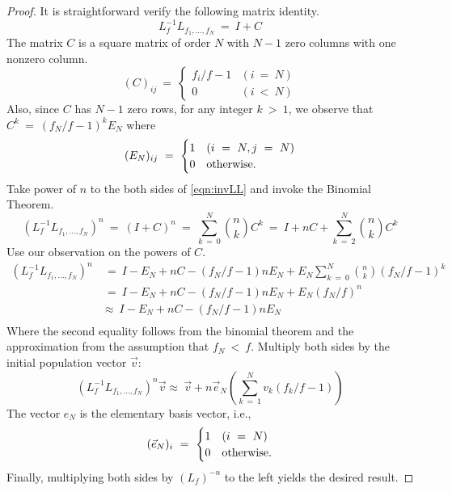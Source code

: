 \documentclass[11pt,reqno]{amsart}
\numberwithin{equation}{section}
\theoremstyle{plain}
\begin{document}
\begin{proof}
It is straightforward verify the following matrix identity. 
\begin{equation}\label{eqn:invLL}
L_f^{-1}L_{f_1, \dots, f_N} \ = \ I + C
\end{equation}
The matrix $C$ is a square matrix of order $N$ with $N-1$ zero columns with 
one nonzero column. 
\begin{equation}
(C)_{ij} \ = \ \begin{cases}
f_i/f - 1 &(i \ = \  N)\\
0 & (i \ < \  N)
\end{cases}
\end{equation}
Also, since $C$ has $N-1$ zero rows, for any integer $k \ > \  1$, we observe that $C^k \ = \ (f_N/f - 1)^k E_N$ where 
\begin{equation}
(E_N)_{ij} \ = \ \begin{cases} 1 & (i \ = \  N, j \ = \  N) \\ 
0 & \rm otherwise.
\end{cases}
\end{equation}
Take power of $n$ to the both sides of \eqref{eqn:invLL} and invoke the Binomial Theorem. 
\begin{equation}
(L_f^{-1}L_{f_1, \dots, f_N} )^n \ = \ 
(I + C)^n \ = \  \sum_{k \ = \  0}^N \binom{n}{k} C^k 
\ = \ I + nC + \sum_{k \ = \  2}^N \binom{n}{k} C^k 
\end{equation}
Use our observation on the powers of $C$. 
\begin{equation}
\begin{split}
(L_f^{-1}L_{f_1, \dots, f_N} )^n & \ = 
\ I - E_N + nC - (f_N/f - 1) n E_N 
+ E_N \sum_{k \ = \  0}^N \binom{n}{k} (f_N/f - 1)^k \\ 
& \ = \ I - E_N + nC - (f_N/f - 1) n E_N 
+ E_N (f_N/f)^n\\ 
& \approx \ I - E_N + nC - (f_N/f - 1) n E_N \\ 
\end{split}
\end{equation}
Where the second equality follows from the binomial theorem and the approximation from the assumption that $f_N \ < \  f$. Multiply both sides by the initial population vector $\vec v$: 
\begin{equation}
(L_f^{-1}L_{f_1, \dots, f_N} )^n\vec v \approx \ 
\vec v + n \vec e_N \left(\sum_{k \ = \  1}^N v_k(f_k/f -1)\right) 
\end{equation}
The vector $e_N$ is the elementary basis vector, i.e., 
\begin{equation}
    (\vec e_N)_i \ = \ \begin{cases}
    1 & (i \ = \  N) \\
    0 & \rm otherwise. 
    \end{cases}
\end{equation}
Finally, multiplying both sides by $(L_f)^{-n}$ to the left yields the desired result. 
\end{proof}
\end{document}
